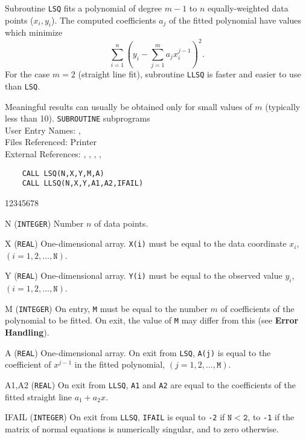                 
              
          
             
\begin{center}
\end{center}
Subroutine {\tt LSQ} fits a polynomial of degree $m-1$ to $n$
equally-weighted data points ($x_i,y_i$). The computed coefficients
$a_j$ of the fitted polynomial have values which minimize
$$\sum^n_{i=1}\left( y_i-\sum^m_{j=1}a_jx_i^{j-1} \right) ^2.$$
For the case $m=2$ (straight line fit), subroutine {\tt LLSQ} is
faster and easier to use than {\tt LSQ}.
\par
Meaningful results can usually be obtained only for small values
of $m$ (typically less than 10).
\Structure
{\tt SUBROUTINE} subprograms \\
User Entry Names: , \\
Files Referenced: Printer\\
External References:
, , ,
, 
\Usage
\begin{verbatim}
    CALL LSQ(N,X,Y,M,A)
    CALL LLSQ(N,X,Y,A1,A2,IFAIL)
\end{verbatim}
\begin{DLtt}{12345678}
\item[N] ({\tt INTEGER}) Number $n$ of data points.
\item[X] ({\tt REAL}) One-dimensional array. {\tt X(i)} must be equal
to the data coordinate $x_i$, \\ $(i=1,2,\ldots,\mathtt{N})$.
\item  [Y] ({\tt REAL}) One-dimensional array. {\tt Y(i)} must be equal
to the observed value $y_i$, \\  $(i=1,2,\ldots,\mathtt{N})$.
\item[M] ({\tt INTEGER}) On entry, {\tt M} must be equal to the number
$m$ of coefficients of the polynomial to be fitted. On exit, the value of
{\tt M} may differ from this (see {\bf Error Handling}).
\item[A] ({\tt REAL}) One-dimensional array. On exit from {\tt LSQ},
{\tt A(j)} is equal to the coefficient of $x^{j-1}$ in the fitted
polynomial, $(j=1,2,\ldots,\mathtt{M})$.
\item[A1,A2] ({\tt REAL}) On exit from {\tt LLSQ}, {\tt A1} and {\tt A2}
are equal to the coefficients of the fitted straight line $a_1+a_2 x$.
\item[IFAIL] ({\tt INTEGER}) On exit from {\tt LLSQ}, {\tt IFAIL}
is equal to {\tt -2} if $\mathtt{N < 2}$, to {\tt -1} if the matrix of
normal equations is numerically singular, and to zero otherwise.
\end{DLtt}
